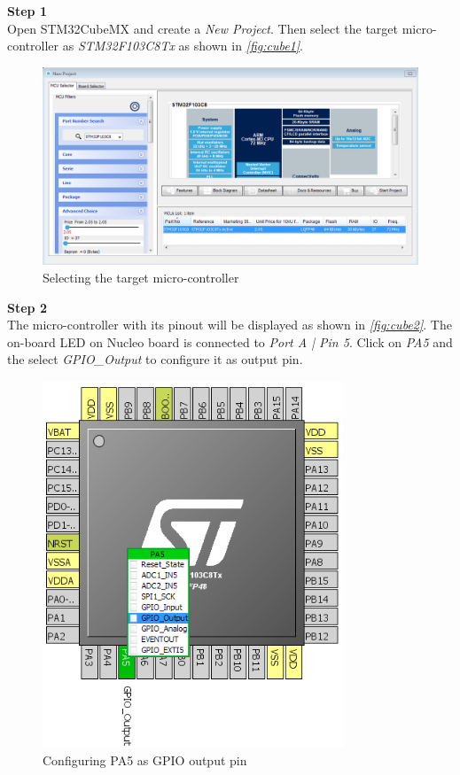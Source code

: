 \documentclass[a4paper,12pt,oneside]{book}
\begin{document}
\textbf{Step 1}
\medskip
\\
Open STM32CubeMX and create a \textit{New Project}. Then select the target micro-controller as \textit{STM32F103C8Tx} as shown in \textit{\autoref{fig:cube1}}.\\

\begin{figure}[!htb]
\centering
\includegraphics[width=\textwidth]{images/cubemx_1}
\caption{Selecting the target micro-controller}
\label{fig:cube1}
\end{figure}

\clearpage

\textbf{Step 2}
\medskip
\\
The micro-controller with its pinout will be displayed as shown in \textit{\autoref{fig:cube2}}. The on-board LED on Nucleo board is connected to \textit{Port A | Pin 5}. Click on \textit{PA5} and the select \textit{GPIO{\_}Output} to configure it as output pin.\\

\begin{figure}[!htb]
\centering
\includegraphics[width=0.8\textwidth]{images/cubemx_2}
\caption{Configuring PA5 as GPIO output pin}
\label{fig:cube2}
\end{figure}
\end{document}
